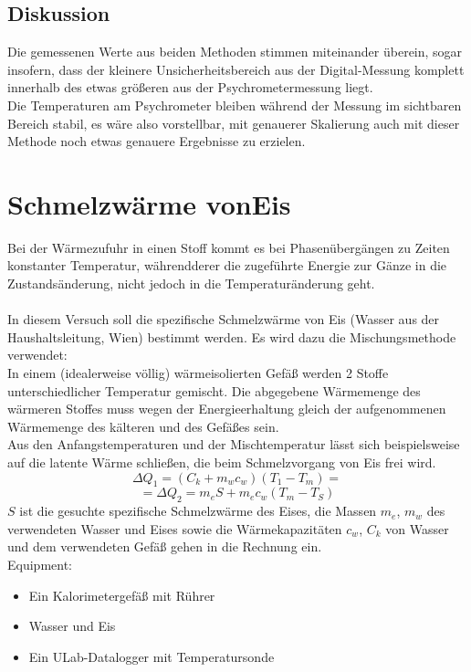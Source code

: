 \documentclass[12pt,a4paper]{article}
\begin{document}
\begin{multicols}{2}
\subsection{Diskussion}

Die gemessenen Werte aus beiden Methoden stimmen miteinander überein, sogar insofern, dass der kleinere Unsicherheitsbereich aus der Digital-Messung komplett innerhalb des etwas größeren aus der Psychrometermessung liegt.\\
Die Temperaturen am Psychrometer bleiben während der Messung im sichtbaren Bereich stabil, es wäre also vorstellbar, mit genauerer Skalierung auch mit dieser Methode noch etwas genauere Ergebnisse zu erzielen.\\



\section{Schmelzwärme vonEis}
Bei der Wärmezufuhr in einen Stoff kommt es bei Phasenübergängen zu Zeiten konstanter Temperatur, währendderer die zugeführte Energie zur Gänze in die Zustandsänderung, nicht jedoch in die Temperaturänderung geht.\\
\\
In diesem Versuch soll die spezifische Schmelzwärme von Eis (Wasser aus der Haushaltsleitung, Wien) bestimmt werden. Es wird dazu die Mischungsmethode verwendet:\\
In einem (idealerweise völlig) wärmeisolierten Gefäß werden 2 Stoffe unterschiedlicher Temperatur gemischt. Die abgegebene Wärmemenge des wärmeren Stoffes muss wegen der Energieerhaltung gleich der aufgenommenen Wärmemenge des kälteren und des Gefäßes sein.\\
Aus den Anfangstemperaturen und der Mischtemperatur lässt sich beispielsweise auf die latente Wärme schließen, die beim Schmelzvorgang von Eis frei wird.
$$\Delta Q_1=(C_k+m_wc_w)(T_1-T_m)=$$
$$=\Delta Q_2 = m_eS+m_ec_w(T_m-T_S)$$
$S$ ist die gesuchte spezifische Schmelzwärme des Eises, die Massen $m_e$, $m_w$ des verwendeten Wasser und Eises sowie die Wärmekapazitäten $c_w$, $C_k$ von Wasser und dem verwendeten Gefäß gehen in die Rechnung ein.\\


\noindent Equipment:
\begin {itemize}
	\item Ein Kalorimetergefäß mit Rührer
	\item Wasser und Eis
	\item Ein ULab-Datalogger mit Temperatursonde
\end {itemize}


\end{multicols}
\end{document}
